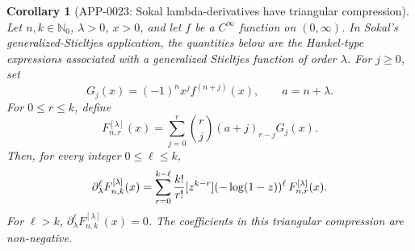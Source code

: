 \documentclass[11pt]{article}
\numberwithin{equation}{section}
\newtheorem{corollary}[theorem]{Corollary}
\theoremstyle{definition}
\theoremstyle{remark}
\newcommand{\1}{\mathbf 1}
\begin{document}
\begin{corollary}[APP-0023: Sokal lambda-derivatives have triangular compression]
\label{thm:app23-sokal-lambda}
Let \(n,k\in\mathbb N_0\), \(\lambda>0\), \(x>0\), and let \(f\) be a
\(C^\infty\) function on \((0,\infty)\).  In Sokal's generalized-Stieltjes
application, the quantities below are the Hankel-type expressions associated
with a generalized Stieltjes function of order \(\lambda\).  For \(j\ge0\), set
\[
  G_j(x)=(-1)^n x^j f^{(n+j)}(x),\qquad a=n+\lambda .
\]
For \(0\le r\le k\), define
\[
  F^{[\lambda]}_{n,r}(x)
   =\sum_{j=0}^r {r\choose j}(a+j)_{r-j}G_j(x).
\]
Then, for every integer \(0\le\ell\le k\),
\[
 \partial_\lambda^\ell F^{[\lambda]}_{n,k}(x)
 =\sum_{r=0}^{k-\ell}{k!\over r!}
   [z^{k-r}](-\log(1-z))^\ell\,F^{[\lambda]}_{n,r}(x).
\]
For \(\ell>k\), \(\partial_\lambda^\ell F^{[\lambda]}_{n,k}(x)=0\).  The
coefficients in this triangular compression are non-negative.


\end{corollary}
\end{document}
